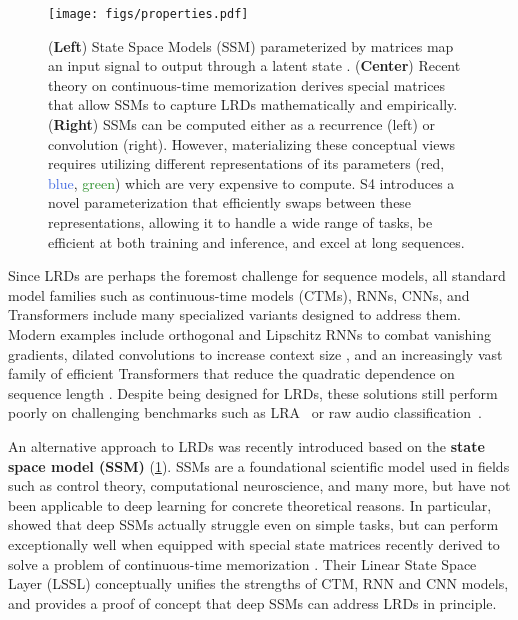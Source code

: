 \documentclass{article}
\newcommand{\methodabbrv}{S4}
\begin{document}
\begin{figure}[!t]
    \centering
    \texttt{[image: figs/properties.pdf]}
    \caption{
      (\textbf{Left}) State Space Models (SSM) parameterized by matrices  map an input signal  to output  through a latent state .
      (\textbf{Center}) Recent theory on continuous-time memorization derives special  matrices that allow SSMs to capture LRDs mathematically and empirically.
      (\textbf{Right}) SSMs can be computed either as a recurrence (left) or convolution (right).
      However, materializing these conceptual views requires utilizing different representations of its parameters (\textcolor{BrickRed}{red}, \textcolor{RoyalBlue}{blue}, \textcolor{ForestGreen}{green}) which are very expensive to compute.
      \methodabbrv{} introduces a novel parameterization that efficiently swaps between these representations, allowing it to handle a wide range of tasks, be efficient at both training and inference, and excel at long sequences.
    }
\label{fig:properties}
\end{figure}


Since LRDs are perhaps {the} foremost challenge for sequence models, all standard model families such as continuous-time models (CTMs), RNNs, CNNs, and Transformers include many specialized variants designed to address them.
Modern examples include orthogonal and Lipschitz RNNs \citep{arjovsky2016unitary,erichson2021lipschitz} to combat vanishing gradients, dilated convolutions to increase context size \citep{bai2018empirical,oord2016wavenet}, and an increasingly vast family of efficient Transformers that reduce the quadratic dependence on sequence length \citep{katharopoulos2020transformers,choromanski2020rethinking}.
Despite being designed for LRDs, these solutions still perform poorly on challenging benchmarks such as LRA~\citep{tay2021long} or raw audio classification~\citep{gu2021lssl}.


An alternative approach to LRDs was recently introduced based on the \textbf{state space model (SSM)} (\cref{fig:properties}).
SSMs are a foundational scientific model used in fields such as control theory, computational neuroscience, and many more, but have not been applicable to deep learning for concrete theoretical reasons.
In particular, \citet{gu2021lssl} showed that deep SSMs actually struggle even on simple tasks,
but can perform exceptionally well when equipped with special state matrices  recently derived to solve a problem of continuous-time memorization \citep{voelker2019legendre,gu2020hippo}.
Their Linear State Space Layer (LSSL) conceptually unifies the strengths of CTM, RNN and CNN models, and provides a proof of concept that deep SSMs can address LRDs in principle.
\end{document}
